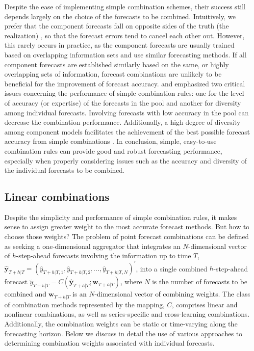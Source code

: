 \documentclass[a4paper,11pt]{article}
\begin{document}
Despite the ease of implementing simple combination schemes, their success still depends largely on the choice of the forecasts to be combined. Intuitively, we prefer that the component forecasts fall on opposite sides of the truth (the realization) \citep{Bates1969-yj,Larrick2006-sr}, so that the forecast errors tend to cancel each other out. However, this rarely occurs in practice, as the component forecasts are usually trained based on overlapping information sets and use similar forecasting methods. If all component forecasts are established similarly based on the same, or highly overlapping sets of information, forecast combinations are unlikely to be beneficial for the improvement of forecast accuracy. \citet{Mannes2014-dl} and \citet{Lichtendahl2020-ut} emphasized two critical issues concerning the performance of simple combination rules: one for the level of accuracy (or expertise) of the forecasts in the pool and another for diversity among individual forecasts. Involving forecasts with low accuracy in the pool can decrease the combination performance. Additionally, a high degree of diversity among component models facilitates the achievement of the best possible forecast accuracy from simple combinations \citep{Thomson2019-al}. In conclusion, simple, easy-to-use combination rules can provide good and robust forecasting performance, especially when properly considering issues such as the accuracy and diversity of the individual forecasts to be combined.

\subsection{Linear combinations}
\label{sec:linear_comb}

Despite the simplicity and performance of simple combination rules, it makes sense to assign greater weight to the most accurate forecast methods. But how to choose those weights? The problem of point forecast combinations can be defined as seeking a one-dimensional aggregator that integrates an $N$-dimensional vector of $h$-step-ahead forecasts involving the information up to time $T$, $\hat{\bm{y}}_{T+h|T}=\left(\hat{y}_{T+h|T, 1}, \hat{y}_{T+h|T, 2}, \dots, \hat{y}_{T+h|T, N}\right)^{\prime}$, into a single combined $h$-step-ahead forecast $\tilde{y}_{T+h|T}=C\left(\hat{\bm{y}}_{T+h|T} ; \bm{w}_{T+h|T}\right)$, where $N$ is the number of forecasts to be combined and $\bm{w}_{T+h|T}$ is an $N$-dimensional vector of combining weights. The class of combination methods represented by the mapping, $C$, comprises linear and nonlinear combinations, as well as series-specific and cross-learning combinations. Additionally, the combination weights can be static or time-varying along the forecasting horizon. Below we discuss in detail the use of various approaches to determining combination weights associated with individual forecasts.
\end{document}
